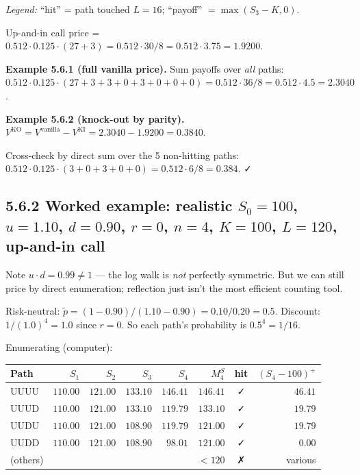 \documentclass[
  10pt,
  twoside]{book}
\newcounter{none} %
\begin{document}
\emph{Legend:} ``hit'' = path touched \(L = 16\); ``payoff''
\(= \max(S_3 - K, 0)\).

Up-and-in call price =
\(0.512 \cdot 0.125 \cdot (27 + 3) = 0.512 \cdot 30/8 = 0.512 \cdot 3.75 = \mathbf{1.9200}\).

\textbf{Example 5.6.1 (full vanilla price).} Sum payoffs over \emph{all}
paths:
\(0.512 \cdot 0.125 \cdot (27 + 3 + 3 + 0 + 3 + 0 + 0 + 0) = 0.512 \cdot 36/8 = 0.512 \cdot 4.5 = \mathbf{2.3040}\).

\textbf{Example 5.6.2 (knock-out by parity).}
\(V^{\text{KO}} = V^{\text{vanilla}} - V^{\text{KI}} = 2.3040 - 1.9200 = \mathbf{0.3840}\).

Cross-check by direct sum over the 5 non-hitting paths:
\(0.512 \cdot 0.125 \cdot (3 + 0 + 3 + 0 + 0) = 0.512 \cdot 6/8 = 0.384\).
✓

\subsection{\texorpdfstring{5.6.2 Worked example: realistic
\(S_0 = 100\), \(u = 1.10\), \(d = 0.90\), \(r = 0\), \(n = 4\),
\(K = 100\), \(L = 120\), up-and-in
call}{5.6.2 Worked example: realistic S\_0 = 100, u = 1.10, d = 0.90, r = 0, n = 4, K = 100, L = 120, up-and-in call}}\label{worked-example-realistic-s_0-100-u-1.10-d-0.90-r-0-n-4-k-100-l-120-up-and-in-call}

Note \(u \cdot d = 0.99 \ne 1\) --- the log walk is \emph{not} perfectly
symmetric. But we can still price by direct enumeration; reflection just
isn't the most efficient counting tool.

Risk-neutral: \(\tilde p = (1 - 0.90)/(1.10 - 0.90) = 0.10/0.20 = 0.5\).
Discount: \(1/(1.0)^4 = 1.0\) since \(r = 0\). So each path's
probability is \(0.5^4 = 1/16\).

Enumerating (computer):

{\def\LTcaptype{none} %
\begin{table}[H]
\centering
\begin{tabular}{|l|r|r|r|r|r|c|r|}
\toprule
Path & \(S_1\) & \(S_2\) & \(S_3\) & \(S_4\) & \(M^S_4\) & hit & \((S_4-100)^+\) \\
\midrule



UUUU & \(110.00\) & \(121.00\) & \(133.10\) & \(146.41\) & \(146.41\) &
✓ & \(46.41\) \\
UUUD & \(110.00\) & \(121.00\) & \(133.10\) & \(119.79\) & \(133.10\) &
✓ & \(19.79\) \\
UUDU & \(110.00\) & \(121.00\) & \(108.90\) & \(119.79\) & \(121.00\) &
✓ & \(19.79\) \\
UUDD & \(110.00\) & \(121.00\) & \(108.90\) & \(98.01\) & \(121.00\) & ✓
& \(0.00\) \\
(others) & & & & & \(< 120\) & ✗ & various \\
\bottomrule
\end{tabular}
\end{table}
}
\end{document}
